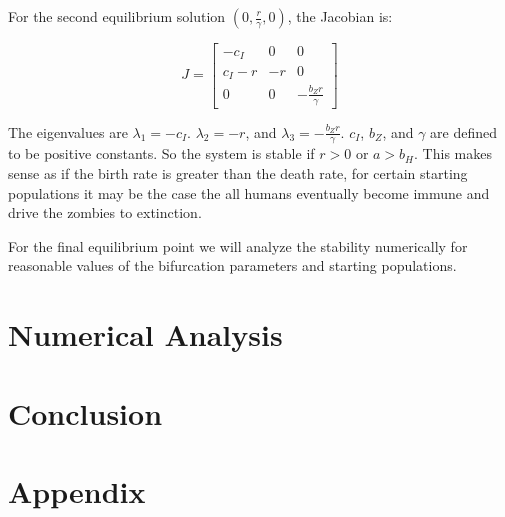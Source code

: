 \documentclass[
	12pt
]{article}
\begin{document}
For the second equilibrium solution $(0,\frac{r}{\gamma},0)$, the Jacobian is:

\begin{equation}
J=\begin{bmatrix} -c_I & 0 & 0 \\ c_I - r & -r & 0 \\ 0 & 0 & -\frac{b_Z r}{\gamma} \end{bmatrix}
\end{equation}

The eigenvalues are $\lambda_1=-c_I$. $\lambda_2=-r$, and $\lambda_3=-\frac{b_Z r}{\gamma}$. $c_I$, $b_Z$, and $\gamma$ are defined to be positive constants. So the system is stable if $r>0$ or $a>b_H$. This makes sense as if the birth rate is greater than the death rate, for certain starting populations it may be the case the all humans eventually become immune and drive the zombies to extinction.

For the final equilibrium point we will analyze the stability numerically for reasonable values of the bifurcation parameters and starting populations.

\section{Numerical Analysis}

\section{Conclusion}

\section{Appendix}
\end{document}
